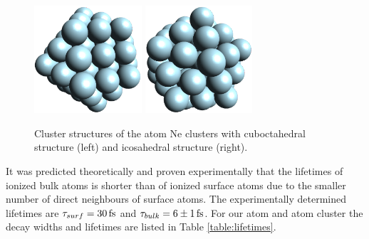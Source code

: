 \begin{figure}[h]
 \centering
 \includegraphics[height=4cm]{fcc.png}
 \hspace{2cm}
 \includegraphics[height=4cm]{ico.png}
 \caption{Cluster structures of the \unit[55]{atom} Ne clusters with
          cuboctahedral structure (left) and icosahedral structure (right).}
 \label{figure:Ne_clusters}
\end{figure}

It was predicted
theoretically and proven experimentally that the lifetimes of ionized bulk atoms
is shorter than of ionized surface atoms due to the smaller number of direct
neighbours of surface atoms. \cite{Santra01_3,Ohrwall04}
The experimentally determined lifetimes are
$\tau_{surf} = \unit[30]{fs}$ and $\tau_{bulk} = \unit[6\pm 1]{fs}$.
\cite{Ohrwall04}
For our \unit[55]{atom} and \unit[923]{atom} cluster the decay widths and lifetimes
are listed in Table \ref{table:lifetimes}.

